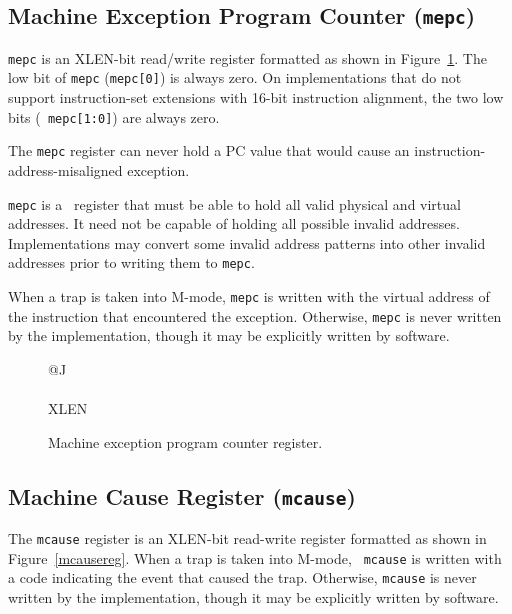 \subsection{Machine Exception Program Counter ({\tt mepc})}

{\tt mepc} is an XLEN-bit read/write register formatted as shown in
Figure~\ref{mepcreg}.  The low bit of {\tt mepc} ({\tt mepc[0]}) is
always zero.  On implementations that do not support instruction-set
extensions with 16-bit instruction alignment, the two low bits ({\tt
  mepc[1:0]}) are always zero.

\begin{commentary}
The {\tt mepc} register can never hold a PC value that would cause an
instruction-address-misaligned exception.
\end{commentary}

{\tt mepc} is a \warl\ register that must be able to hold all valid physical
and virtual addresses.  It need not be capable of holding all possible invalid
addresses.  Implementations may convert some invalid address patterns into
other invalid addresses prior to writing them to {\tt mepc}.

When a trap is taken into M-mode, {\tt mepc} is written with the virtual
address of the instruction that encountered the exception.  Otherwise,
{\tt mepc} is never written by the implementation, though it may be
explicitly written by software.

\begin{figure}[h!]
{\footnotesize
\begin{center}
\begin{tabular}{@{}J}
 \\
\hline
{} \\
\hline
XLEN \\
\end{tabular}
\end{center}
}
\vspace{-0.1in}
\caption{Machine exception program counter register.}
\label{mepcreg}
\end{figure}

\subsection{Machine Cause Register ({\tt mcause})}

The {\tt mcause} register is an XLEN-bit read-write register formatted as
shown in Figure~\ref{mcausereg}.  When a trap is taken into M-mode, {\tt
mcause} is written with a code indicating the event that caused the trap.
Otherwise, {\tt mcause} is never written by the implementation, though it may be
explicitly written by software.

